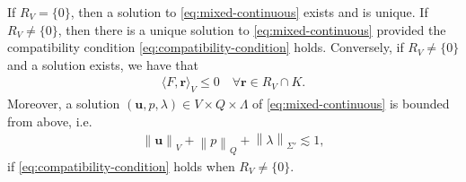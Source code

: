 \documentclass[onefignum,onetabnum]{siamart190516}
\newcommand{\br}{\boldsymbol{r}}
\newcommand{\bu}{\boldsymbol{u}}
\newcommand{\nrm}[1]{\left\lVert#1\right\rVert}
\begin{document}
\begin{theorem}\label{thm:continuous-well-posed}
	If $R_V = \{0\}$, then a solution to \eqref{eq:mixed-continuous} exists and is unique. If $R_V \neq \{0\}$, then there is a unique solution to \eqref{eq:mixed-continuous} provided the compatibility condition \eqref{eq:compatibility-condition} holds. Conversely, if $R_V \neq \{0\}$ and a solution exists, we have that
	\begin{align}\label{eq:compatibility-condition-weak}
		\langle F, \br \rangle_V \leq 0 \quad \forall \br\in R_V \cap K.
	\end{align}		
	 Moreover, a solution $(\bu,p,\lambda)\in V\times Q\times \Lambda$ of \eqref{eq:mixed-continuous} is bounded from above, i.e.
	\begin{align}\label{eq:bound-solution}
		\nrm{\bu}_V + \nrm{p}_Q + \nrm{\lambda}_{\Sigma'} \lesssim 1,
	\end{align}
	if \eqref{eq:compatibility-condition} holds when $R_V \neq \{0\}$.
\end{theorem}
\end{document}
